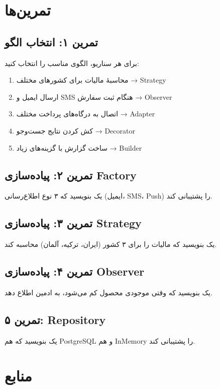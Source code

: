 \documentclass[12pt, a4paper]{article}
\begin{document}
\section{تمرین‌ها}

\subsection{تمرین ۱: انتخاب الگو}
برای هر سناریو، الگوی مناسب را انتخاب کنید:
\begin{enumerate}
    \item محاسبهٔ مالیات برای کشورهای مختلف → Strategy
    \item ارسال ایمیل و SMS هنگام ثبت سفارش → Observer
    \item اتصال به درگاه‌های پرداخت مختلف → Adapter
    \item کش کردن نتایج جست‌وجو → Decorator
    \item ساخت گزارش با گزینه‌های زیاد → Builder
\end{enumerate}

\subsection{تمرین ۲: پیاده‌سازی Factory}
یک  بنویسید که ۳ نوع اطلاع‌رسانی (ایمیل، SMS، Push) 
را پشتیبانی کند.

\subsection{تمرین ۳: پیاده‌سازی Strategy}
یک  بنویسید که مالیات را برای ۳ کشور (ایران، ترکیه، آلمان) 
محاسبه کند.

\subsection{تمرین ۴: پیاده‌سازی Observer}
یک  بنویسید که وقتی موجودی محصول کم می‌شود، به ادمین 
اطلاع دهد.

\subsection{تمرین ۵: Repository}
یک  بنویسید که هم PostgreSQL و هم InMemory را 
پشتیبانی کند.

\section{منابع}
\end{document}
